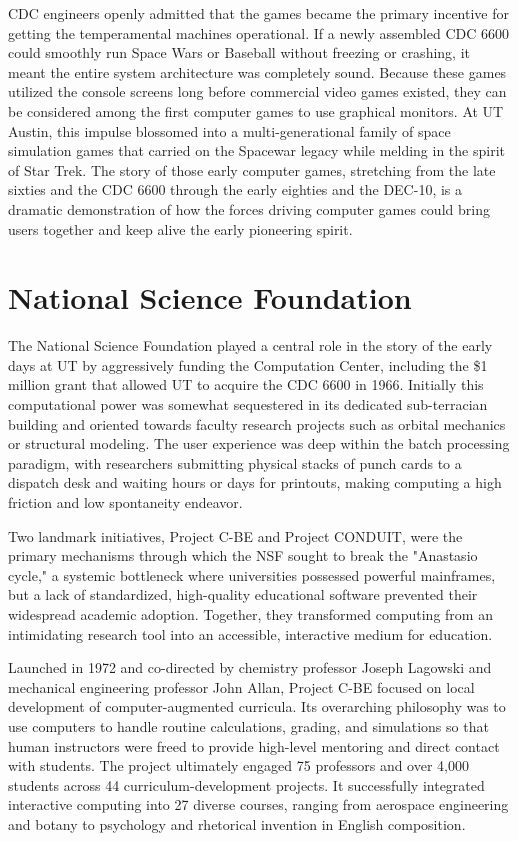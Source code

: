CDC engineers openly admitted that the games became the primary incentive for getting the temperamental machines operational. If a newly assembled CDC 6600 could smoothly run Space Wars or Baseball without freezing or crashing, it meant the entire system architecture was completely sound. Because these games utilized the console screens long before commercial video games existed, they can be considered among the first computer games to use graphical monitors.
At UT Austin, this impulse blossomed into a multi-generational family of space simulation games that carried on the Spacewar legacy while melding in the spirit of Star Trek. The story of those early computer games, stretching from the late sixties and the CDC 6600 through the early eighties and the DEC-10, is a dramatic demonstration of how the forces driving computer games could bring users together and keep alive the early pioneering spirit.

\section{National Science Foundation}

The National Science Foundation played a central role in the story of the early days at UT by aggressively funding the Computation Center, including the \$1 million grant that allowed UT to acquire the CDC 6600 in 1966. Initially this computational power was somewhat sequestered  in its dedicated sub-terracian building and oriented towards faculty research projects such as orbital mechanics or structural modeling. The user experience was deep within the batch processing paradigm, with researchers submitting physical stacks of punch cards to a dispatch desk and waiting hours or days for printouts, making computing a high friction and low spontaneity endeavor.

Two landmark initiatives, Project C-BE and Project CONDUIT, were the primary mechanisms through which the NSF sought to break the "Anastasio cycle," a systemic bottleneck where universities possessed powerful mainframes, but a lack of standardized, high-quality educational software prevented their widespread academic adoption. Together, they transformed computing from an intimidating research tool into an accessible, interactive medium for education.

Launched in 1972 and co-directed by chemistry professor Joseph Lagowski and mechanical engineering professor John Allan, Project C-BE focused on local development of computer-augmented curricula. Its overarching philosophy was to use computers to handle routine calculations, grading, and simulations so that human instructors were freed to provide high-level mentoring and direct contact with students. The project ultimately engaged 75 professors and over 4,000 students across 44 curriculum-development projects. It successfully integrated interactive computing into 27 diverse courses, ranging from aerospace engineering and botany to psychology and rhetorical invention in English composition.

